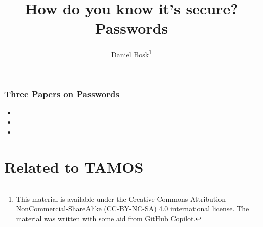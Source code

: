 \title{%
  How do you know it's secure?
  Passwords
}
\author{Daniel Bosk\thanks{%
    This material is available under the Creative Commons 
    Attribution-NonCommercial-ShareAlike (CC-BY-NC-SA) 4.0 international 
    license.
    The material was written with some aid from GitHub Copilot.
}}

\begin{frame}
  \maketitle
\end{frame}

\mode*

\begin{abstract}
  
\end{abstract}

\clearpage

\begin{frame}
  \frametitle{Three Papers on Passwords}
  \begin{itemize}
    \item {}
    \item {}
    \item {}
  \end{itemize}
\end{frame}

\section{Related to TAMOS}

